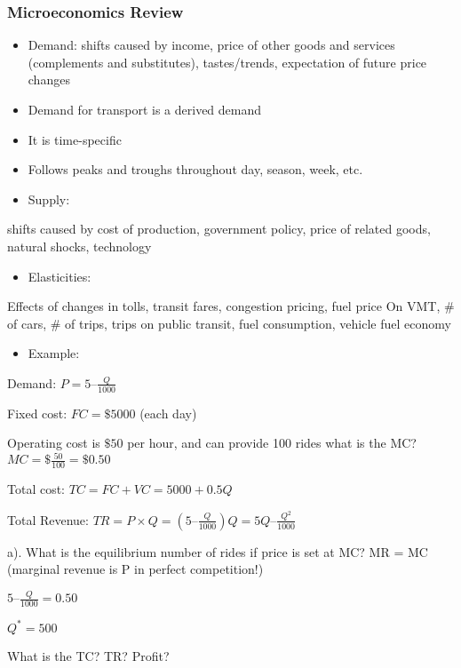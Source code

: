 \documentclass[]{article}
\providecommand{\tightlist}{%
  \setlength{\itemsep}{0pt}\setlength{\parskip}{0pt}}
\begin{document}
\hypertarget{microeconomics-review-1}{%
\subsubsection{Microeconomics Review}\label{microeconomics-review-1}}

\begin{itemize}
\item
  Demand: shifts caused by income, price of other goods and services
  (complements and substitutes), tastes/trends, expectation of future
  price changes
\item
  Demand for transport is a derived demand
\item
  It is time-specific
\item
  Follows peaks and troughs throughout day, season, week, etc.
\item
  Supply:
\end{itemize}

shifts caused by cost of production, government policy, price of related
goods, natural shocks, technology

\begin{itemize}
\tightlist
\item
  Elasticities:
\end{itemize}

Effects of changes in tolls, transit fares, congestion pricing, fuel
price On VMT, \# of cars, \# of trips, trips on public transit, fuel
consumption, vehicle fuel economy

\begin{itemize}
\tightlist
\item
  Example:
\end{itemize}

Demand: \(P=5–\frac{Q}{1000}\)

Fixed cost: \(FC = \$5000\) (each day)

Operating cost is \(\$50\) per hour, and can provide 100 rides what is
the MC? \(MC = \$\frac{50}{100}=\$0.50\)

Total cost: \(TC = FC + VC = 5000 + 0.5Q\)

Total Revenue: \(TR=P\times Q=(5–\frac{Q}{1000})Q=5Q–\frac{Q^2}{1000}\)

a). What is the equilibrium number of rides if price is set at MC? MR =
MC (marginal revenue is P in perfect competition!)

\(5–\frac{Q}{1000}=0.50\)

\(Q^*=500\)

What is the TC? TR? Profit?
\end{document}
